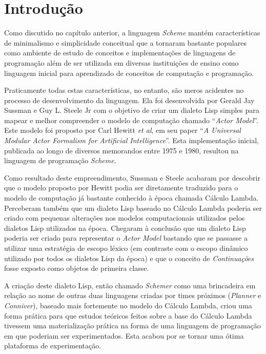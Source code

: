 
\section{Introdução}
\label{sec:introducao_scheme}

Como discutido no capítulo anterior, a linguagem \textit{Scheme} mantém
características de minimalismo e simplicidade conceitual que a tornaram
bastante populares como ambiente de estudo de conceitos e implementações de
linguagens de programação além de ser utilizada em diversas instituições de
ensino como linguagem inicial para aprendizado de conceitos de computação e
programação.

Praticamente todas estas características, no entanto, são meros acidentes no
processo de desenvolvimento da linguagem. Ela foi desenvolvida por Gerald Jay
Sussman e Guy L. Steele Jr com o objetivo de  criar um dialeto Lisp simples
para mapear e melhor compreender o modelo de computação chamado ``\textit{Actor
Model}''. Este modelo foi proposto por Carl Hewitt \textit{et al}, em seu paper
``\textit{A Universal Modular Actor Formalism for Artificial Intelligence}''.
Esta implementação inicial, publicada ao longo de diversos memorandos entre
1975 e 1980, resultou na linguagem de programação \textit{Scheme}.\cite{first-report}

Como resultado deste empreendimento, Sussman e Steele acabaram por descobrir
que o modelo proposto por Hewitt podia ser diretamente traduzido para o modelo
de computação já bastante conhecido à época chamada Cálculo Lambda. Perceberam
também que um dialeto Lisp baseado no Cálculo Lambda poderia ser criado com
pequenas alterações nos modelos computacionais utilizados pelos dialetos Lisp
utilizados na época. Chegaram à conclusão que um dialeto Lisp poderia ser
criado para representar o \textit{Actor Model} bastando que se passasse a
utilizar uma estratégia de escopo léxico (em contraste com o escopo dinâmico
utilizado por todos os dialetos Lisp da época) e que o conceito de
\textit{Continuações} fosse exposto como objetos de primeira classe.

A criação deste dialeto Lisp, então chamado \textit{Schemer} como uma
brincadeira em relação ao nome de outras duas linguagens criadas por times
próximos (\textit{Planner} e \textit{Conniver}), baseado mais fortemente no
modelo do Cálculo Lambda, criou uma forma prática para que estudos teóricos
feitos sobre a base do Cálculo Lambda tivessem uma materialização prática na
forma de uma linguagem de programação em que poderiam ser experimentados. Esta
acabou por se tornar uma ótima plataforma de experimentação\cite{first-report}.


